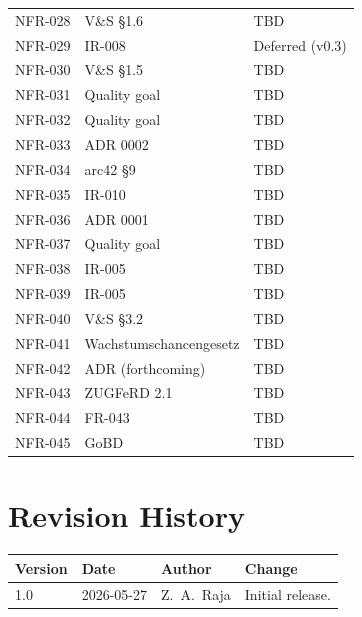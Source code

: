 \documentclass[11pt,a4paper]{article}
\begin{document}
\begin{longtable}{lll}
NFR-028 & V\&S \S1.6 & TBD \\
NFR-029 & IR-008 & Deferred (v0.3) \\
NFR-030 & V\&S \S1.5 & TBD \\
NFR-031 & Quality goal & TBD \\
NFR-032 & Quality goal & TBD \\
NFR-033 & ADR 0002 & TBD \\
NFR-034 & arc42 \S9 & TBD \\
NFR-035 & IR-010 & TBD \\
NFR-036 & ADR 0001 & TBD \\
NFR-037 & Quality goal & TBD \\
NFR-038 & IR-005 & TBD \\
NFR-039 & IR-005 & TBD \\
NFR-040 & V\&S \S3.2 & TBD \\
NFR-041 & Wachstumschancengesetz & TBD \\
NFR-042 & ADR (forthcoming) & TBD \\
NFR-043 & ZUGFeRD 2.1 & TBD \\
NFR-044 & FR-043 & TBD \\
NFR-045 & GoBD & TBD \\
\bottomrule
\end{longtable}

\section{Revision History}

\begin{table}[H]
\centering
\begin{tabular}{llll}
\toprule
\textbf{Version} & \textbf{Date} & \textbf{Author} & \textbf{Change} \\
\midrule
1.0 & 2026-05-27 & Z.~A.~Raja & Initial release. \\
\bottomrule
\end{tabular}
\end{table}

\end{document}
